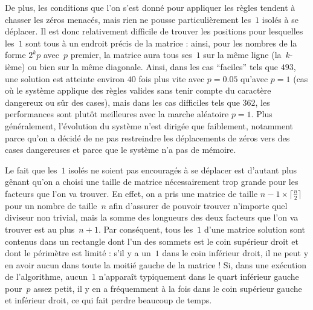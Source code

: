 De plus, les conditions que l'on s'est donné pour appliquer les règles tendent à chasser les zéros menacés, mais rien ne pousse particulièrement les~$1$ isolés à se déplacer. Il est donc relativement difficile de trouver les positions pour lesquelles les~$1$ sont tous à un endroit précis de la matrice : ainsi, pour les nombres de la forme $2^kp$ avec~$p$ premier, la matrice aura tous ses~$1$ sur la même ligne (la~$k$-ième) ou bien sur la même diagonale. Ainsi, dans les cas ``faciles'' tels que $493$, une solution est atteinte environ $40$ fois plus vite avec $p=0.05$ qu'avec $p=1$ (cas où le système applique des règles valides sans tenir compte du caractère dangereux ou sûr des cases), mais dans les cas difficiles tels que $362$, les performances sont plutôt meilleures avec la marche aléatoire $p=1$. Plus généralement, l'évolution du système n'est dirigée que faiblement, notamment parce qu'on a décidé de ne pas restreindre les déplacements de zéros vers des cases dangereuses et parce que le système n'a pas de mémoire.

Le fait que les~$1$ isolés ne soient pas encouragés à se déplacer est d'autant plus gênant qu'on a choisi une taille de matrice nécessairement trop grande pour les facteurs que l'on va trouver. En effet, on a pris une matrice de taille $n-1 \times \lceil \frac{n}{2} \rceil$ pour un nombre de taille~$n$ afin d'assurer de pouvoir trouver n'importe quel diviseur non trivial, mais la somme des longueurs des deux facteurs que l'on va trouver est au plus~$n+1$. Par conséquent, tous les~$1$ d'une matrice solution sont contenus dans un rectangle dont l'un des sommets est le coin supérieur droit et dont le périmètre est limité : s'il y a un~$1$ dans le coin inférieur droit, il ne peut y en avoir aucun dans toute la moitié gauche de la matrice ! Si, dans une exécution de l'algorithme, aucun~$1$ n'apparaît typiquement dans le quart inférieur gauche pour~$p$ assez petit, il y en a fréquemment à la fois dans le coin supérieur gauche et inférieur droit, ce qui fait perdre beaucoup de temps. 


